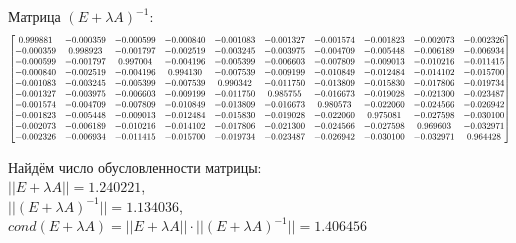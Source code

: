 \documentclass[14pt,a4paper]{scrartcl}
\newcommand\scalemath[2]{\scalebox{#1}{\mbox{\ensuremath{\displaystyle #2}}}}
\begin{document}
Матрица $(E + \lambda A)^{-1}$:
\begin{equation*}
\scalemath{0.71}
{
	\begin{bmatrix}{}
	0.999881 & -0.000359 & -0.000599 & -0.000840 & -0.001083 & -0.001327 & -0.001574 & -0.001823 & -0.002073 & -0.002326 \\ 
	-0.000359 & 0.998923 & -0.001797 & -0.002519 & -0.003245 & -0.003975 & -0.004709 & -0.005448 & -0.006189 & -0.006934 \\ 
	-0.000599 & -0.001797 & 0.997004 & -0.004196 & -0.005399 & -0.006603 & -0.007809 & -0.009013 & -0.010216 & -0.011415 \\ 
	-0.000840 & -0.002519 & -0.004196 & 0.994130 & -0.007539 & -0.009199 & -0.010849 & -0.012484 & -0.014102 & -0.015700 \\ 
	-0.001083 & -0.003245 & -0.005399 & -0.007539 & 0.990342 & -0.011750 & -0.013809 & -0.015830 & -0.017806 & -0.019734 \\ 
	-0.001327 & -0.003975 & -0.006603 & -0.009199 & -0.011750 & 0.985755 & -0.016673 & -0.019028 & -0.021300 & -0.023487 \\ 
	-0.001574 & -0.004709 & -0.007809 & -0.010849 & -0.013809 & -0.016673 & 0.980573 & -0.022060 & -0.024566 & -0.026942 \\ 
	-0.001823 & -0.005448 & -0.009013 & -0.012484 & -0.015830 & -0.019028 & -0.022060 & 0.975081 & -0.027598 & -0.030100 \\ 
	-0.002073 & -0.006189 & -0.010216 & -0.014102 & -0.017806 & -0.021300 & -0.024566 & -0.027598 & 0.969603 & -0.032971 \\ 
	-0.002326 & -0.006934 & -0.011415 & -0.015700 & -0.019734 & -0.023487 & -0.026942 & -0.030100 & -0.032971 & 0.964428 \\ 
	\end{bmatrix}
}
\end{equation*}


Найдём число обусловленности матрицы:\\
$||E + \lambda A|| = 1.240221$,\\  $||(E + \lambda A)^{-1} || = 1.134036$,\\  $cond(E + \lambda A) = ||E + \lambda A|| \cdot ||(E + \lambda A)^{-1} || = 1.406456 $
\end{document}
